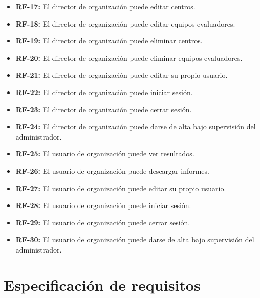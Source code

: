 \begin{itemize}
	\item \textbf{RF-17:} El director de organización puede editar centros.
	\item \textbf{RF-18:} El director de organización puede editar equipos evaluadores.
	\item \textbf{RF-19:} El director de organización puede eliminar centros.
	\item \textbf{RF-20:} El director de organización puede eliminar equipos evaluadores.
	\item \textbf{RF-21:} El director de organización puede editar su propio usuario.
	\item \textbf{RF-22:} El director de organización puede iniciar sesión.
	\item \textbf{RF-23:} El director de organización puede cerrar sesión.
	\item \textbf{RF-24:} El director de organización puede darse de alta bajo supervisión del administrador.
	\item \textbf{RF-25:} El usuario de organización puede ver resultados.
	\item \textbf{RF-26:} El usuario de organización puede descargar informes.
	\item \textbf{RF-27:} El usuario de organización puede editar su propio usuario.
	\item \textbf{RF-28:} El usuario de organización puede iniciar sesión.
	\item \textbf{RF-29:} El usuario de organización puede cerrar sesión.
	\item \textbf{RF-30:} El usuario de organización puede darse de alta bajo supervisión del administrador.
\end{itemize}
\section{Especificación de requisitos}

